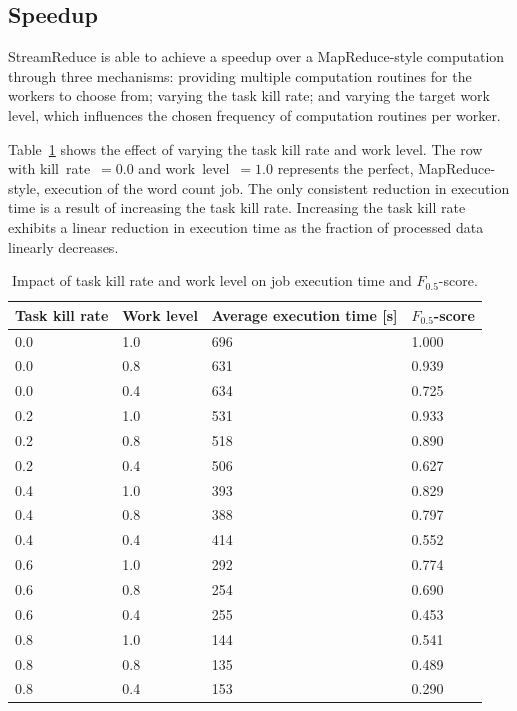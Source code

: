 \documentclass[12pt,twocolumn]{article}
\begin{document}
\subsection{Speedup}
StreamReduce is able to achieve a speedup over a MapReduce-style computation through
three mechanisms:
providing multiple computation routines for the workers to choose from; varying the task kill
rate; and varying the target work level, which influences the chosen frequency of
computation
routines per worker.

Table~\ref{table:runtime} shows the effect of varying the task kill rate and work level. The
row
with kill~rate~$=0.0$ and work~level~$=1.0$ represents the perfect, MapReduce-style,
execution
of the word count job. The only consistent reduction in execution time is a result of
increasing the task kill rate. Increasing the task kill rate exhibits a linear reduction in
execution
time as the fraction of processed data linearly decreases.

\begin{table}
\begin{tabularx}{\linewidth}{|X|X|X|X|}
\hline
Task kill rate & Work level & Average execution time [s] & $F_{0.5}$-score \\ \hline\hline
0.0 & 1.0 & 696 & 1.000 \\ \hline
0.0 & 0.8 & 631 & 0.939 \\ \hline
0.0 & 0.4 & 634 & 0.725 \\ \hline\hline
0.2 & 1.0 & 531 & 0.933 \\ \hline
0.2 & 0.8 & 518 & 0.890 \\ \hline
0.2 & 0.4 & 506 & 0.627 \\ \hline\hline
0.4 & 1.0 & 393 & 0.829 \\ \hline
0.4 & 0.8 & 388 & 0.797 \\ \hline
0.4 & 0.4 & 414 & 0.552 \\ \hline\hline
0.6 & 1.0 & 292 & 0.774 \\ \hline
0.6 & 0.8 & 254 & 0.690 \\ \hline
0.6 & 0.4 & 255 & 0.453 \\ \hline\hline
0.8 & 1.0 & 144 & 0.541 \\ \hline
0.8 & 0.8 & 135 & 0.489 \\ \hline
0.8 & 0.4 & 153 & 0.290 \\ \hline
\end{tabularx}
\caption{Impact of task kill rate and work level on job execution time and $F_{0.5}$-score.}
\label{table:runtime}
\end{table}
\end{document}
